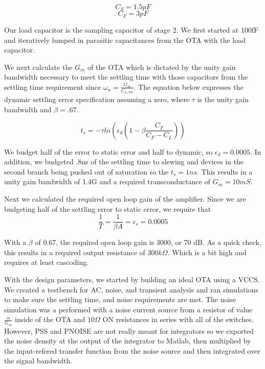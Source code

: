 \documentclass[conference]{IEEEtran}
\begin{document}
$$C_S = 1.5pF$$ 
$$C_F = 3pF$$

Our load capacitor is the sampling capacitor of stage 2. We first started at 100fF and iteratively lumped in parasitic capacitances from the OTA with the load capacitor.

We next calculate the $G_m$ of the OTA which is dictated by the unity gain bandwidth necessary to meet the settling time with those capacitors from the settling time requirement since $\omega_u = \frac{G_m}{C_{L,tot}} $. The equation below expresses the dynamic settling error specification assuming a zero, where $\tau$ is the unity gain bandwidth and $\beta=.67$.  

$$t_s = -\tau ln \left(\epsilon_d \left(1-\beta \frac{C_F}{C_F-C_L}\right)\right)$$

We budget half of the error to static error and half to dynamic, so $\epsilon_d = 0.0005$. In addition, we budgeted .8ns of the settling time to slewing and devices in the second branch being pushed out of saturation so the $t_s = 1ns$. This results in a unity gain bandwidth of 1.4G and a required transconductance of $G_m = 10mS$.

Next we calculated the required open loop gain of the amplifier. Since we are budgeting half of the settling error to static error, we require that
$$\frac{1}{T} = \frac{1}{\beta A} = \epsilon_s = 0.0005$$

With a $\beta$ of 0.67, the required open loop gain is 3000, or 70 dB. As a quick check, this results in a required output resistance of $300k\Omega$. Which is a bit high and requires at least cascoding.

With the design parameters, we started by building an ideal OTA using a VCCS. We created a testbench for AC, noise, and transient analysis and ran simulations to make sure the settling time, and noise requirements are met. The noise simulation was a performed with a noise current source from a resistor of value $\frac{\alpha}{G_m}$ inside of the OTA and $10\Omega$ ON resistances in series with all of the switches. However, PSS and PNOISE are not really meant for integrators so we exported the noise density at the output of the integrator to Matlab, then multiplied by the input-refered transfer function from the noise source and then integrated over the signal bandwidth.
\end{document}
